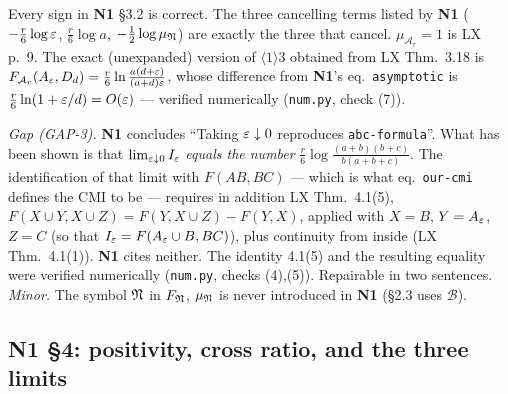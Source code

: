 \documentclass[11pt]{article}
\newcommand{\Ar}{\mathcal A_r}
\newcommand{\NI}{\textbf{N1}}
\newcommand{\loc}[1]{{\small\texttt{#1}}}
\newcommand{\1}{\mathbf 1}
\begin{document}
\begin{verdictok}
Every sign in \NI{} \S3.2 is correct. The three cancelling terms listed by \NI{}
($-\frac r6\log\varepsilon$, $\frac r6\log a$, $-\frac12\log\mu_{\mathfrak N}$) are exactly the three that cancel.
$\mu_{\Ar}=1$ is LX p.~9. The exact (unexpanded) version of $\langle1\rangle3$ obtained from
LX Thm.~3.18 is $F_{\Ar}(A_\eps,D_d)=\frac r6\ln\frac{a(d+\eps)}{(a+d)\eps}$, whose difference from
\NI's eq.~\loc{asymptotic} is $\frac r6\ln(1+\varepsilon/d)=O(\varepsilon)$ --- verified numerically
(\loc{num.py}, check (7)).
\end{verdictok}
\begin{verdictgap}
\emph{Gap (GAP-3).} \NI{} concludes ``Taking $\varepsilon\downarrow0$ reproduces \loc{abc-formula}''.
What has been shown is that $\lim_{\varepsilon\downarrow0}I_\varepsilon$ \emph{equals the number}
$\frac r6\log\frac{(a+b)(b+c)}{b(a+b+c)}$. The identification of that limit with
$F(AB,BC)$ --- which is what eq.~\loc{our-cmi} defines the CMI to be --- requires in addition
LX Thm.~4.1(5), $F(X\cup Y,X\cup Z)=F(Y,X\cup Z)-F(Y,X)$, applied with $X=B$, $Y=A_\varepsilon$, $Z=C$
(so that $I_\varepsilon=F(A_\varepsilon\cup B,BC)$), plus continuity from inside (LX Thm.~4.1(1)).
\NI{} cites neither. The identity 4.1(5) and the resulting equality were verified numerically
(\loc{num.py}, checks (4),(5)). Repairable in two sentences.
\emph{Minor.} The symbol $\mathfrak N$ in $F_{\mathfrak N}$, $\mu_{\mathfrak N}$ is never introduced in \NI{} (\S2.3 uses $\mathcal B$).
\end{verdictgap}

\subsection{N1 \S4: positivity, cross ratio, and the three limits}
\end{document}
